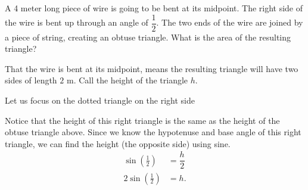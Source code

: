 \documentclass[nooutcomes]{ximera}
\begin{document}
\begin{example}
	
	A 4 meter long piece of wire is going to be bent at its midpoint. The right side of the wire is bent up through an angle of $\dfrac{1}{2}$. The two ends
	of the wire are joined by a piece of string, creating an obtuse triangle. What is the area of the resulting triangle?
	
	\begin{explanation}
		
		That the wire is bent at its midpoint, means the resulting triangle will have two sides of length $2$ m.
		Call the height of the triangle $h$.

		\begin{image}[4in]
		\end{image}
		
		Let us focus on the dotted triangle on the right side		

		\begin{image}[2in]
		\end{image}
		
		Notice that the height of this right triangle is the same as the height of the obtuse triangle above. Since we know the hypotenuse and base angle of this right triangle, we can find the height (the opposite side) using sine.
		\begin{align*}
			\sin\left( \frac{1}{2} \right) &= \dfrac{h}{2}\\
			2 \sin\left( \frac{1}{2} \right) &= h.
		\end{align*}


\end{explanation}
\end{example}
\end{document}
